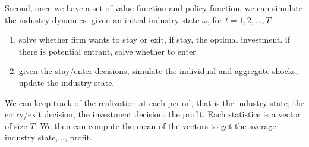 \documentclass[12pt]{article}[margin=1in]
\begin{document}
Second, once we have a set of value function and policy function, we can simulate the industry dynamics.
given an initial industry state $\omega$, for $t=1,2,\ldots,T$:
\begin{enumerate}
    \item solve whether firm wants to stay or exit, if stay, the optimal investment. if there is potential entrant, solve whether to enter. 
    \item given the stay/enter decisions, simulate the individual and aggregate shocks, update the industry state.
\end{enumerate}
We can keep track of the realization at each period, that is the industry state, the entry/exit decision, the investment decision, the profit. Each statistics is a vector of size $T$. We then can compute the mean of the vectors to get the average industry state,..., profit.

\end{document}
